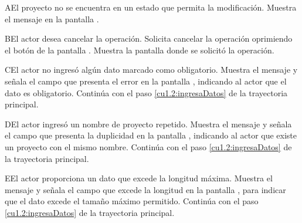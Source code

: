  \begin{UCtrayectoriaA}{A}{El proyecto no se encuentra en un estado que permita la modificación.}
    \UCpaso[\UCsist] Muestra el mensaje  en la pantalla .
 \end{UCtrayectoriaA} 
 \begin{UCtrayectoriaA}{B}{El actor desea cancelar la operación.}
    \UCpaso[\UCactor] Solicita cancelar la operación oprimiendo el botón  de la pantalla .
    \UCpaso[\UCsist] Muestra la pantalla donde se solicitó la operación.
 \end{UCtrayectoriaA} 
 \begin{UCtrayectoriaA}{C}{El actor no ingresó algún dato marcado como obligatorio.}
    \UCpaso[\UCsist] Muestra el mensaje  y señala el campo que presenta el error en la pantalla 
	    , indicando al actor que el dato es obligatorio.
    \UCpaso[] Continúa con el paso \ref{cu1.2:ingresaDatos} de la trayectoria principal.
 \end{UCtrayectoriaA}
 \begin{UCtrayectoriaA}{D}{El actor ingresó un nombre de proyecto repetido.}
    \UCpaso[\UCsist] Muestra el mensaje  y señala el campo que presenta la duplicidad en la pantalla 
	    , indicando al actor que existe un proyecto con el mismo nombre.
    \UCpaso[] Continúa con el paso \ref{cu1.2:ingresaDatos} de la trayectoria principal.
 \end{UCtrayectoriaA}
 
 \begin{UCtrayectoriaA}{E}{El actor proporciona un dato que excede la longitud máxima.}
    \UCpaso[\UCsist] Muestra el mensaje  y señala el campo que excede la 
    longitud en la pantalla , para indicar que el dato excede el tamaño máximo permitido.
    \UCpaso[] Continúa con el paso \ref{cu1.2:ingresaDatos} de la trayectoria principal.
 \end{UCtrayectoriaA}
 
